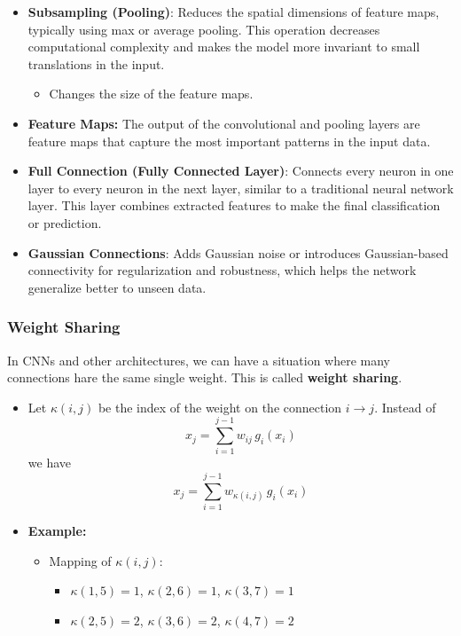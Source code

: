 \begin{example}
\begin{itemize}
        \item \textbf{Subsampling (Pooling)}: Reduces the spatial dimensions of feature maps, typically using max or average pooling. This operation decreases computational complexity and makes the model more invariant to small translations in the input.
        \begin{itemize}
            \item Changes the size of the feature maps.
        \end{itemize}

        \item \textbf{Feature Maps:} The output of the convolutional and pooling layers are feature maps that capture the most important patterns in the input data.
    
        \item \textbf{Full Connection (Fully Connected Layer)}: Connects every neuron in one layer to every neuron in the next layer, similar to a traditional neural network layer. This layer combines extracted features to make the final classification or prediction.
    
        \item \textbf{Gaussian Connections}: Adds Gaussian noise or introduces Gaussian-based connectivity for regularization and robustness, which helps the network generalize better to unseen data.
    \end{itemize}   
\end{example}

\subsubsection{Weight Sharing}
\begin{summary}
    In CNNs and other architectures, we can have a situation where many connections hare the same single weight. This is called \textbf{weight sharing}.
    \begin{itemize}
        \item Let \( \kappa(i, j) \) be the index of the weight on the connection \( i \rightarrow j \). Instead of
        \[
        x_j = \sum_{i=1}^{j-1} w_{ij} \, g_i(x_i)
        \]
        we have
        \[
        x_j = \sum_{i=1}^{j-1} w_{\kappa(i,j)} \, g_i(x_i)
        \]
    
        \item \textbf{Example:}
        \begin{itemize}
            \item Mapping of \( \kappa(i, j) \):
            \begin{itemize}
                \item \( \kappa(1,5) = 1 \), \( \kappa(2,6) = 1 \), \( \kappa(3,7) = 1 \)
                \item \( \kappa(2,5) = 2 \), \( \kappa(3,6) = 2 \), \( \kappa(4,7) = 2 \)
            \end{itemize}
        \end{itemize}
    \end{itemize}
\end{summary}

